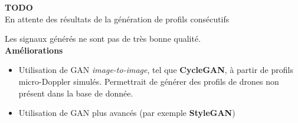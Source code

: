 \documentclass[a0,portrait]{a0poster}
\begin{document}
\begin{multicols}{2}

\begin{tcolorbox}[colback=blue!5!white,colframe=blue!75!black,title,title={\section*{Résultats}}]
\textbf{TODO}\\
En attente des résultats de la génération de profils consécutifs
\end{tcolorbox}
\bigskip


\begin{tcolorbox}[colback=red!5!orange,colframe=red!75!black,title={\section*{Perspectives}}]
Les signaux générés ne sont pas de très bonne qualité.\\
\textbf{Améliorations}
\begin{itemize}
    \item Utilisation de GAN \textit{image-to-image}, tel que \textbf{CycleGAN}, à partir de profils micro-Doppler simulés. Permettrait de générer des profils de drones non présent dans la base de donnée.
    \item Utilisation de GAN plus avancés (par exemple \textbf{StyleGAN})
\end{itemize}
\end{tcolorbox}
\end{multicols}
\end{document}

